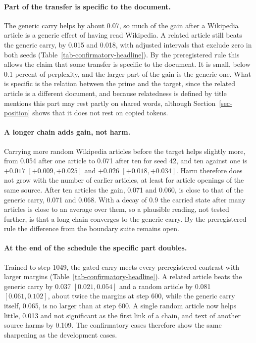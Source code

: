 \documentclass[12pt,a4paper]{report}
\begin{document}
\paragraph{Part of the transfer is specific to the document.} The generic carry helps by about 0.07, so much of the gain after a Wikipedia article is a generic effect of having read Wikipedia. A related article still beats the generic carry, by 0.015 and 0.018, with adjusted intervals that exclude zero in both seeds (Table~\ref{tab-confirmatory-headline}). By the preregistered rule this allows the claim that some transfer is specific to the document. It is small, below 0.1 percent of perplexity, and the larger part of the gain is the generic one. What is specific is the relation between the prime and the target, since the related article is a different document, and because relatedness is defined by title mentions this part may rest partly on shared words, although Section~\ref{sec-position} shows that it does not rest on copied tokens.

\paragraph{A longer chain adds gain, not harm.} Carrying more random Wikipedia articles before the target helps slightly more, from 0.054 after one article to 0.071 after ten for seed 42, and ten against one is $+0.017$ $[+0.009, +0.025]$ and $+0.026$ $[+0.018, +0.034]$. Harm therefore does not grow with the number of earlier articles, at least for article openings of the same source. After ten articles the gain, 0.071 and 0.060, is close to that of the generic carry, 0.071 and 0.068. With a decay of 0.9 the carried state after many articles is close to an average over them, so a plausible reading, not tested further, is that a long chain converges to the generic carry. By the preregistered rule the difference from the boundary suite remains open.

\paragraph{At the end of the schedule the specific part doubles.} Trained to step 1049, the gated carry meets every preregistered contrast with larger margins (Table~\ref{tab-confirmatory-headline}). A related article beats the generic carry by 0.037 $[0.021, 0.054]$ and a random article by 0.081 $[0.061, 0.102]$, about twice the margins at step 600, while the generic carry itself, 0.065, is no larger than at step 600. A single random article now helps little, 0.013 and not significant as the first link of a chain, and text of another source harms by 0.109. The confirmatory cases therefore show the same sharpening as the development cases.
\end{document}
